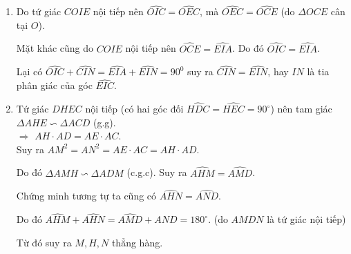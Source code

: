 \begin{ex}
{\begin{enumerate}
$\Rightarrow$ $AN^2 = AE\cdot AC$.\\
Tương tự, ta cũng có $\Delta ANI \backsim \Delta AON$.\\
$\Rightarrow$ $AN^2 = AI\cdot AO$.\\
Suy ra, $AI \cdot AO = AE \cdot AC$ hay $\dfrac{AI}{AE} = \dfrac{AC}{AO}$.\\
$\Rightarrow$ $\Delta AIE \backsim \Delta ACO$. \\
$\Rightarrow$ $\widehat{OCA} = \widehat{EIA}$.\\
$\Rightarrow$ $\widehat{OIE} + \widehat{OCE} = 180^\circ$. Suy ra tứ giác $COIE$ nội tiếp.

\item Do tứ giác $COIE$ nội tiếp nên $\widehat{OIC} = \widehat{OEC}$, mà $\widehat{OEC} = \widehat{OCE}$ (do $\Delta OCE$ cân tại $O$). \smallskip

Mặt khác cũng do $COIE$ nội tiếp nên $\widehat{OCE} = \widehat{EIA}$. Do đó $\widehat{OIC} = \widehat{EIA}$. \smallskip

Lại có $\widehat{OIC} + \widehat{CIN} = \widehat{EIA} + \widehat{EIN} = 90^0$ suy ra $\widehat{CIN} = \widehat{EIN}$, hay $IN$ là tia phân giác của góc $\widehat{EIC}$.

\item Tứ giác $DHEC$ nội tiếp (có hai góc đối $\widehat{HDC} = \widehat{HEC} = 90^\circ$) nên tam giác $\Delta AHE \backsim \Delta ACD$ (g.g). \\
$\Rightarrow$ $AH \cdot AD = AE \cdot AC$.\\
Suy ra $AM^2 = AN^2 = AE\cdot AC = AH\cdot AD$. \smallskip

\noindent Do đó $\Delta AMH \backsim \Delta ADM$ (c.g.c). Suy ra $\widehat{AHM} = \widehat{AMD}$. \smallskip

Chứng minh tương tự ta cũng có $\widehat{AHN} = \widehat{AND}$. \smallskip

Do đó $\widehat{AHM} + \widehat{AHN} = \widehat{AMD} + \widehat{AND} = 180^\circ$. (do $AMDN$ là tứ giác nội tiếp)\smallskip

Từ đó suy ra $M, H, N$ thẳng hàng.
\end{enumerate}
}
\end{ex}


